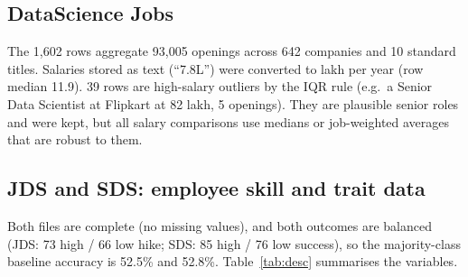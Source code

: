 
\subsection{DataScience Jobs}

The 1,602 rows aggregate 93,005 openings across 642 companies and 10 standard titles. Salaries
stored as text (``7.8L'') were converted to lakh per year (row median 11.9). 39 rows are
high-salary outliers by the IQR rule (e.g.\ a Senior Data Scientist at Flipkart at 82 lakh, 5
openings). They are plausible senior roles and were kept, but all salary comparisons use medians or
job-weighted averages that are robust to them.

\subsection{JDS and SDS: employee skill and trait data}

Both files are complete (no missing values), and both outcomes are balanced
(JDS: 73 high / 66 low hike; SDS: 85 high / 76 low success), so the majority-class baseline
accuracy is 52.5\% and 52.8\%. Table~\ref{tab:desc} summarises the variables.

\begin{table}[H]\centering\small
\caption{Descriptive statistics with group means by outcome.}\label{tab:desc}
\begin{subtable}{\linewidth}\centering
\caption{JDS Skill Traits (1--5 scale; outcome: salary hike).}
\end{subtable}\\[6pt]
\begin{subtable}{\linewidth}\centering
\caption{SDS Personality Traits (normalised scores; outcome: success).}
\end{subtable}
\end{table}

